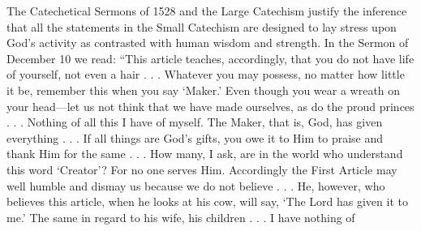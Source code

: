 The Catechetical Sermons of 1528 and the Large Catechism justify the inference that all the statements in the Small Catechism are designed to lay stress upon God’s activity as contrasted with human wisdom and strength. In the Sermon of December 10 we read: “This article teaches, accordingly, that you do not have life of yourself, not even a hair . . . Whatever you may possess, no matter how little it be, remember this when you say ‘Maker.’ Even though you wear a wreath on your head—let us not think that we have made ourselves, as do the proud princes . . . Nothing of all this I have of myself. The Maker, that is, God, has given everything . . . If all things are God’s gifts, you owe it to Him to praise and thank Him for the same . . . How many, I ask, are in the world who understand this word ‘Creator’? For no one serves Him. Accordingly the First Article may well humble and dismay us because we do not believe . . . He, however, who believes this article, when he looks at his cow, will say, ‘The Lord has given it to me.’ The same in regard to his wife, his children . . . I have nothing of
